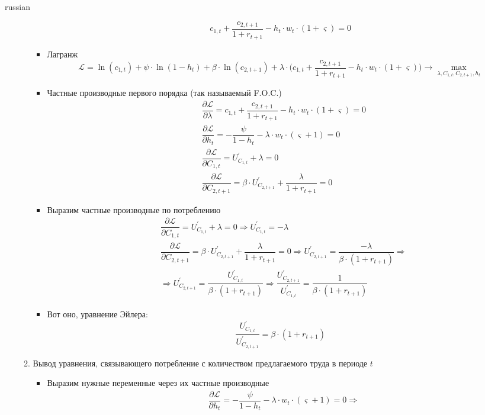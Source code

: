 \documentclass[fleqn]{article}
\begin{document}
\begin{otherlanguage*}{russian}
\begin{enumerate}[label=\alph*), leftmargin=*]
\begin{enumerate}[label=(\arabic*)]
\begin{itemize}
$$ c_{1,t} + \dfrac{c_{2,t+1}}{1 + r_{t+1}} - h_t \cdot w_t \cdot (1 + \varsigma) = 0 $$
\item Лагранж 
$$
\mathcal{L} = \ln (c_{1, t}) + \psi \cdot \ln (1 - h_t) + \beta \cdot \ln (c_{2, t+1}) + \lambda \cdot \Big( c_{1,t} + \dfrac{c_{2,t+1}}{1 + r_{t+1}} - h_t \cdot w_t \cdot (1 + \varsigma) \Big) \rightarrow \max_{\lambda, C_{1,t}, C_{2,t+1}, h_t}
$$
\item Частные производные первого порядка (так называемый F.O.C.) 
\begin{align*}
&\dfrac{\partial \mathcal{L}}{\partial \lambda} = c_{1,t} + \dfrac{c_{2,t+1}}{1 + r_{t+1}} - h_t \cdot w_t \cdot (1 + \varsigma) = 0 
\\ 
&\dfrac{\partial \mathcal{L}}{\partial h_t} = - \dfrac{\psi}{1 - h_t} - \lambda \cdot w_t \cdot (\varsigma + 1) = 0 
\\
&\dfrac{\partial \mathcal{L}}{\partial C_{1, t}} = U^{'}_{C_{1,t}} + \lambda = 0
\\
&\dfrac{\partial \mathcal{L}}{\partial C_{2, t+1}} = \beta \cdot U^{'}_{C_{2,t+1}}  + \dfrac{\lambda}{1 + r_{t+1}} = 0
\end{align*}
\item Выразим частные производные по потреблению 
\begin{align*}
&\dfrac{\partial \mathcal{L}}{\partial C_{1, t}}  = U^{'}_{C_{1,t}}  + \lambda = 0 \Rightarrow U^{'}_{C_{1,t}} = - \lambda \\ 
&\dfrac{\partial \mathcal{L}}{\partial C_{2, t+1}} = \beta \cdot  U^{'}_{C_{2,t+1}} + \dfrac{\lambda}{1 + r_{t+1}} = 0 \Rightarrow U^{'}_{C_{2,t+1}}  = \dfrac{-\lambda}{\beta \cdot (1 + r_{t+1})} \Rightarrow \\
&\Rightarrow  U^{'}_{C_{2,t+1}}  = \dfrac{U^{'}_{C_{1,t}}}{\beta \cdot (1 + r_{t+1})} \Rightarrow \dfrac{U^{'}_{C_{2,t+1}} }{U^{'}_{C_{1,t}} } = \dfrac{1}{\beta \cdot (1 + r_{t+1})} 
\end{align*}
\item Вот оно, уравнение Эйлера:
$$ \dfrac{U^{'}_{C_{1,t}} }{U^{'}_{C_{2,t+1}} } = \beta \cdot (1 + r_{t+1})$$ 
\end{itemize}
\item Вывод уравнения, связывающего потребление с количеством предлагаемого труда в периоде $ t $ 
\begin{itemize}
\item Выразим нужные переменные через их частные производные 
\begin{align*}
&\dfrac{\partial \mathcal{L}}{\partial h_t} = - \dfrac{\psi}{1 - h_t} - \lambda \cdot w_t \cdot (\varsigma + 1) = 0  \Rightarrow 

\end{align*}
\end{itemize}
\end{enumerate}
\end{enumerate}
\end{otherlanguage*}
\end{document}
